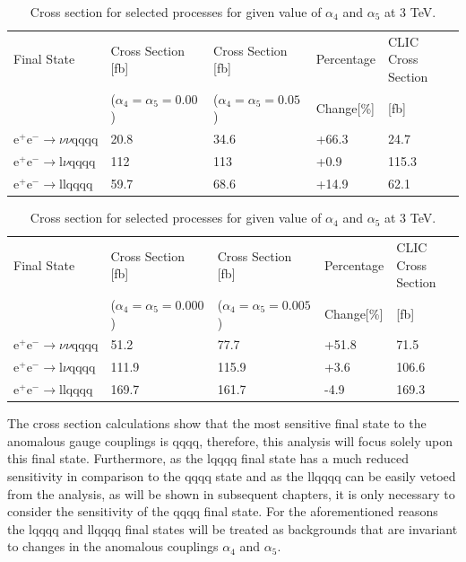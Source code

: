 \begin{table}[h!]
\centering
\begin{tabular}{ l l l l l}
\hline
Final State & Cross Section [fb] & Cross Section [fb] & Percentage & CLIC Cross Section \\ 
& ($\alpha_{4} = \alpha_{5} = 0.00$) & ($\alpha_{4} = \alpha_{5} = 0.05$) & Change[\%] & [fb] \\ 
\hline
$\text{e}^{+}\text{e}^{-} \rightarrow \nu{\nu}\text{qqqq}$ & 20.8 & 34.6 & +66.3 & 24.7 \\
$\text{e}^{+}\text{e}^{-} \rightarrow \text{l}{\nu}\text{qqqq}$ & 112 & 113 & +0.9 & 115.3 \\
$\text{e}^{+}\text{e}^{-} \rightarrow \text{llqqqq}$ & 59.7 & 68.6 & +14.9 & 62.1 \\
\hline
\end{tabular}
\caption{Cross section for selected processes for given value of $\alpha_{4}$ and $\alpha_{5}$ at 1.4 TeV.}
\label{table:crosssectionsensitivity1400}

\begin{tabular}{ l l l l l}
\hline
Final State & Cross Section [fb] & Cross Section [fb] & Percentage & CLIC Cross Section \\ 
& ($\alpha_{4} = \alpha_{5} = 0.000$) & ($\alpha_{4} = \alpha_{5} = 0.005$) & Change[\%] & [fb] \\ 
\hline
$\text{e}^{+}\text{e}^{-} \rightarrow \nu{\nu}\text{qqqq}$ & 51.2 & 77.7 & +51.8 & 71.5 \\
$\text{e}^{+}\text{e}^{-} \rightarrow \text{l}{\nu}\text{qqqq}$ & 111.9 & 115.9 & +3.6 & 106.6 \\
$\text{e}^{+}\text{e}^{-} \rightarrow \text{llqqqq}$ & 169.7 & 161.7 & -4.9 & 169.3 \\
\hline
\end{tabular}
\caption{Cross section for selected processes for given value of $\alpha_{4}$ and $\alpha_{5}$ at 3 TeV.}
\label{table:crosssectionsensitivity3000}
\end{table}

The cross section calculations show that the most sensitive final state to the anomalous gauge couplings is \nu{\nu}qqqq, therefore, this analysis will focus solely upon this final state.  Furthermore, as the l{\nu}qqqq final state has a much reduced sensitivity in comparison to the \nu{\nu}qqqq state and as the llqqqq can be easily vetoed from the analysis, as will be shown in subsequent chapters, it is only necessary to consider the sensitivity of the \nu{\nu}qqqq final state.  For the aforementioned reasons the l{\nu}qqqq and llqqqq final states will be treated as backgrounds that are invariant to changes in the anomalous couplings $\alpha_{4}$ and $\alpha_{5}$.  


